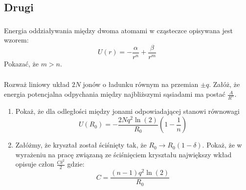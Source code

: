 \newpage

\subsection{Drugi}
\subsubsection{}
Energia oddziaływania między dwoma atomami w cząsteczce opisywana jest wzorem:
\[U(r) = -\frac{\alpha}{r^n}+\frac{\beta}{r^m}\]
Pokazać, że $m>n$.
\subsubsection{}
Rozważ liniowy układ $2N$ jonów o ładunku równym na przemian $\pm q$. Załóż, że energia potencjalna odpychania między najbliższymi sąsiadami ma postać $\frac{A}{R^n}$. 
\begin{enumerate}
\item Pokaż, że dla odległości między jonami odpowiadającej stanowi równowagi 
\[U(R_0) = -\frac{2Nq^2\ln(2)}{R_0}\left(1-\frac{1}{n}\right)\]
\item Załóżmy, że kryształ został ściśnięty tak, że $R_0\rightarrow R_0(1-\delta)$. Pokaż, że w wyrażeniu na pracę związaną ze ściśnięciem kryształu największy wkład opisuje człon $\frac{C\delta^2}{2}$ gdzie:
\[C=\frac{(n-1)q^2\ln(2)}{R_0}\]
\end{enumerate}
